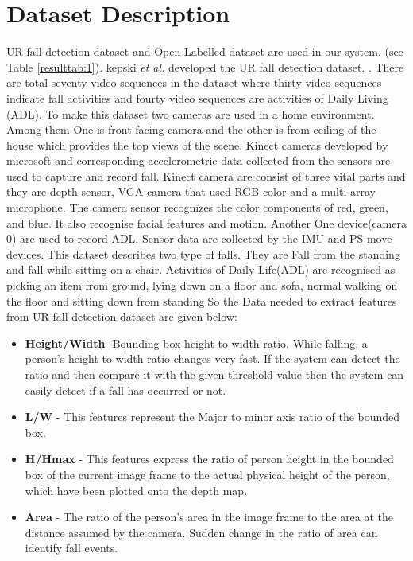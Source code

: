 \section{Dataset Description}
UR fall detection dataset and Open Labelled dataset are used in our system.
(see Table \ref{resulttab:1}).
 kepski 
\emph{et al.} developed the UR fall detection dataset.
\cite{kwolek_human_2014}. There are total seventy video sequences in the dataset where thirty video sequences indicate fall activities and  fourty video sequences are activities 
of Daily Living (ADL).
To make this dataset two cameras are used in a home environment. Among them One is front facing camera and the other is from ceiling of the house which provides the top views of the scene.  Kinect cameras developed by microsoft and corresponding accelerometric data collected from the sensors are used to capture and record fall. Kinect camera are consist of three vital parts and they are depth sensor, VGA camera that used RGB color and a multi array microphone. The camera sensor recognizes the color components of red, green,
and blue. It also recognise facial features and motion. Another One device(camera 0) are used to record ADL. Sensor data are collected by the IMU and PS move devices. This dataset describes two type of falls. They are Fall from the standing and fall while sitting on a chair. Activities of Daily Life(ADL) are recognised as picking an item from ground, lying down on a floor and sofa, normal walking on the floor and sitting down from standing.So the Data needed to extract features from UR fall detection dataset are given below:\\
\begin{itemize}
    \item \textbf{Height/Width}- Bounding box height to width ratio. While falling, a person's height to width ratio changes very fast. If the system can detect the ratio and then compare it with the given threshold value then the system can easily detect if a fall has occurred or not. 
    
    \item \textbf{L/W} - This features represent the Major to minor axis ratio of the bounded box.
    
    \item \textbf{H/Hmax} - This features express the ratio of person height in the bounded box of the current image frame to the actual physical height of the person, which have been plotted onto the depth map. 
    
    \item \textbf{Area} - The ratio of the person's area in the image frame
to the area at the distance assumed by the camera. Sudden change in the ratio of area can identify fall events.
\end{itemize} 

